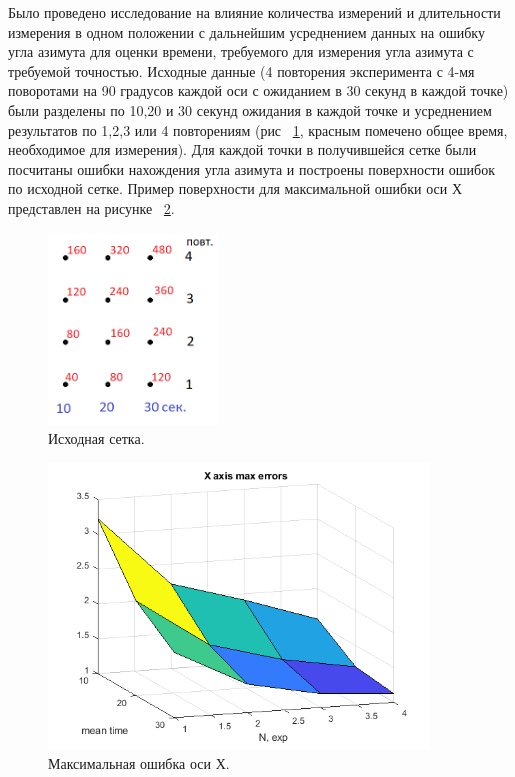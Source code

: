 \documentclass[a4paper,12pt]{article}
\begin{document}
Было проведено исследование на влияние количества измерений и длительности измерения в одном положении с дальнейшим усреднением данных на ошибку угла азимута для оценки времени, требуемого для измерения угла азимута с требуемой точностью. Исходные данные (4 повторения эксперимента с 4-мя поворотами на 90 градусов каждой оси с ожиданием в 30 секунд в каждой точке) были разделены по 10,20 и 30 секунд ожидания в каждой точке и усреднением результатов по 1,2,3 или 4 повторениям (рис ~\ref{fig:Matrix}, красным помечено общее время, необходимое для измерения).  Для каждой точки в получившейся сетке были посчитаны ошибки нахождения угла азимута и построены поверхности ошибок по исходной сетке. Пример поверхности для максимальной ошибки оси Х представлен на рисунке ~\ref{fig:Mesh}. 
\begin{figure}[h] 
\centering
\includegraphics[width=0.4\textwidth]{matrix.png} 
\caption{\label{fig:Matrix} Исходная сетка.}
\end{figure}

\begin{figure}[h] 
\centering
\includegraphics[width=0.9\textwidth]{mesh.png} 
\caption{\label{fig:Mesh} Максимальная ошибка оси Х.}
\end{figure}
\end{document}
